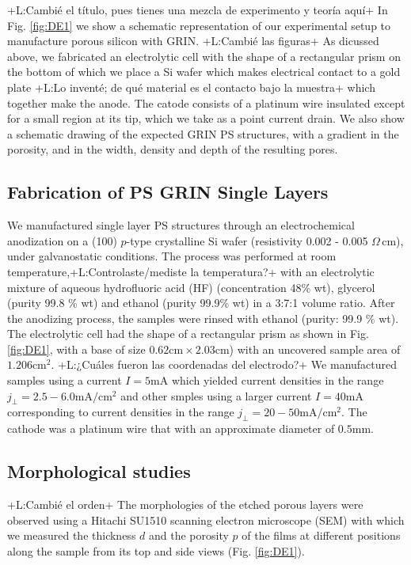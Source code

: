 \documentclass{article}
\newcommand{\notaL}[1]{{\color{blue}+L:#1+}}
\begin{document}
\notaL{Cambié el título, pues tienes una mezcla de experimento y
  teoría aquí}
In Fig. \ref{fig:DE1} we show a schematic representation of our
experimental setup to manufacture porous silicon with GRIN.
\notaL{Cambié las figuras}
As dicussed above, we fabricated an electrolytic cell with the shape of a
rectangular prism on the bottom of which we place a Si wafer which makes
electrical contact to a gold plate \notaL{Lo inventé; de qué material es
  el contacto bajo la muestra} which together make the anode. The
catode consists of a platinum wire insulated except for a small region
at its tip, which we take as a point current drain.
We also show a schematic drawing of the expected GRIN PS structures,
with a gradient in the porosity, and in the width, density and depth
of the resulting pores.

\subsection{Fabrication of PS  GRIN Single Layers}
\label{sec:fabrication-ps-grin}
We manufactured single layer PS structures through an electrochemical
anodization on a (100) $p$-type crystalline Si wafer
(resistivity 0.002 - 0.005 $ \Omega\,\text{cm}$), under galvanostatic
conditions. The process was performed at
room temperature,\notaL{Controlaste/mediste la temperatura?} with an
electrolytic mixture of aqueous hydrofluoric
acid (HF) (concentration 48\% wt), glycerol (purity 99.8 \% wt) and
ethanol (purity 99.9\% wt) in a 3:7:1 volume ratio. After the
anodizing process, the samples were rinsed with
ethanol (purity: 99.9 $ \% $  wt). The electrolytic cell had the shape
of a rectangular prism as shown in Fig. \ref{fig:DE1}, with a base of
size $0.62\text{cm}\times2.03\text{cm}$) with an uncovered sample area
of $1.206\text{cm}^2$. \notaL{¿Cuáles fueron las coordenadas del
  electrodo?} We manufactured samples using a current $I=5\text{mA}$
which yielded current densities in the range
$j_\perp=2.5-6.0\text{mA}/\text{cm}^2$ and other smples using a larger
current $I=40\text{mA}$ corresponding to current densities in the
range $j_\perp=20-50\text{mA}/\text{cm}^2$. The cathode was a
platinum wire that with an approximate diameter of $0.5\text{mm}$.
\subsection{Morphological studies}
\label{sec:morph-stud}
\notaL{Cambié el orden}
The morphologies of the etched porous layers were
observed using a Hitachi SU1510 scanning electron microscope (SEM)
with which we measured the thickness $d$ and the porosity $p$ of the
films at different positions along the sample from its top and side
views (Fig. \ref{fig:DE1}).
\end{document}
